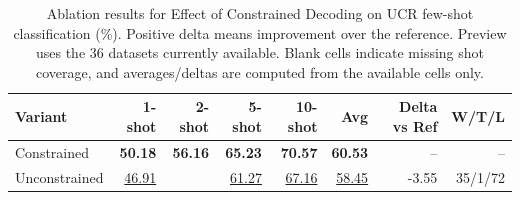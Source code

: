 \begin{table}[t]
\centering
\caption{Ablation results for Effect of Constrained Decoding on UCR few-shot classification (\%). Positive delta means improvement over the reference. Preview uses the 36 datasets currently available. Blank cells indicate missing shot coverage, and averages/deltas are computed from the available cells only.}
\label{tab:m2_constrained_decoding_ablation_partial_preview-ablation-main}
\begin{tabular}{lrrrrrrr}
\toprule
Variant & 1-shot & 2-shot & 5-shot & 10-shot & Avg & Delta vs Ref & W/T/L \\
\midrule
Constrained & \textbf{50.18} & \textbf{56.16} & \textbf{65.23} & \textbf{70.57} & \textbf{60.53} & -- & -- \\
Unconstrained & \underline{46.91} &  & \underline{61.27} & \underline{67.16} & \underline{58.45} & -3.55 & 35/1/72 \\
\bottomrule
\end{tabular}
\end{table}

